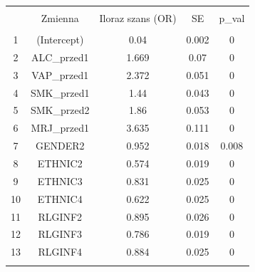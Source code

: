 
\begin{tabular}{@{\extracolsep{5pt}} ccccc} 
\\[-1.8ex]\hline 
\hline \\[-1.8ex] 
 & Zmienna & Iloraz szans (OR) & SE & p\_val \\ 
\hline \\[-1.8ex] 
1 & (Intercept) & 0.04 & 0.002 & 0 \\ 
2 & ALC\_przed1 & 1.669 & 0.07 & 0 \\ 
3 & VAP\_przed1 & 2.372 & 0.051 & 0 \\ 
4 & SMK\_przed1 & 1.44 & 0.043 & 0 \\ 
5 & SMK\_przed2 & 1.86 & 0.053 & 0 \\ 
6 & MRJ\_przed1 & 3.635 & 0.111 & 0 \\ 
7 & GENDER2 & 0.952 & 0.018 & 0.008 \\ 
8 & ETHNIC2 & 0.574 & 0.019 & 0 \\ 
9 & ETHNIC3 & 0.831 & 0.025 & 0 \\ 
10 & ETHNIC4 & 0.622 & 0.025 & 0 \\ 
11 & RLGINF2 & 0.895 & 0.026 & 0 \\ 
12 & RLGINF3 & 0.786 & 0.019 & 0 \\ 
13 & RLGINF4 & 0.884 & 0.025 & 0 \\ 
\hline \\[-1.8ex] 
\end{tabular} 
